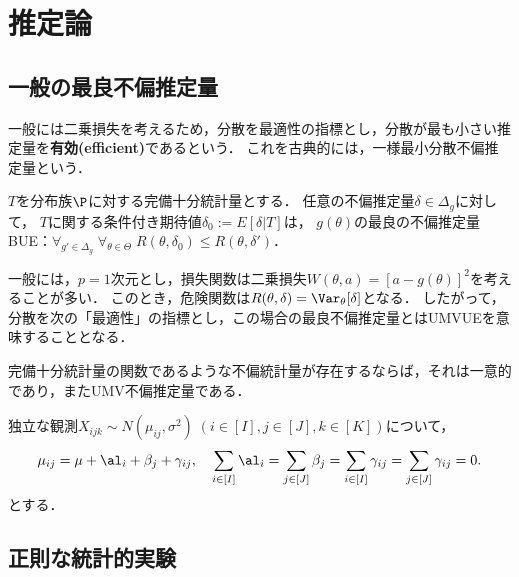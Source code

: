 \documentclass[uplatex,dvipdfmx]{jsreport}
\begin{document}
\section{推定論}

\subsection{一般の最良不偏推定量}

\begin{tcolorbox}[colframe=ForestGreen, colback=ForestGreen!10!white,breakable,colbacktitle=ForestGreen!40!white,coltitle=black,fonttitle=\bfseries\sffamily,
title=]
    一般には二乗損失を考えるため，分散を最適性の指標とし，分散が最も小さい推定量を\textbf{有効(efficient)}であるという．
    これを古典的には，一様最小分散不偏推定量という．
\end{tcolorbox}

\begin{theorem}\label{thm-Lehmann-Scheffé}
    $T$を分布族$\P$に対する完備十分統計量とする．
    任意の不偏推定量$\delta\in\Delta_g$に対して，
    $T$に関する条件付き期待値$\delta_0:=E[\delta|T]$は，
    $g(\theta)$の最良の不偏推定量BUE：$\forall_{g'\in\Delta_g}\;\forall_{\theta\in\Theta}\;R(\theta,\delta_0)\le R(\theta,\delta')$．
\end{theorem}
\begin{remarks}[UMVUE]
    一般には，$p=1$次元とし，損失関数は二乗損失$W(\theta,a)=[a-g(\theta)]^2$を考えることが多い．
    このとき，危険関数は$R(\theta,\delta)=\Var_\theta[\delta]$となる．
    したがって，分散を次の「最適性」の指標とし，この場合の最良不偏推定量とはUMVUEを意味することとなる．
\end{remarks}

\begin{corollary}
    完備十分統計量の関数であるような不偏統計量が存在するならば，それは一意的であり，またUMV不偏推定量である．
\end{corollary}

\begin{example}[繰り返しのある二元配置分散分析]
    独立な観測$X_{ijk}\sim N(\mu_{ij},\sigma^2)\;(i\in[I],j\in[J],k\in[K])$について，
    \[\mu_{ij}=\mu+\al_i+\beta_j+\gamma_{ij},\quad\sum_{i\in[I]}\al_i=\sum_{j\in[J]}\beta_j=\sum_{i\in[I]}\gamma_{ij}=\sum_{j\in[J]}\gamma_{ij}=0.\]
    とする．
\end{example}

\subsection{正則な統計的実験}
\end{document}

